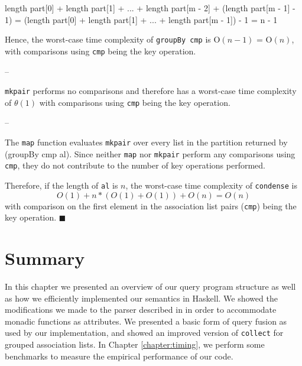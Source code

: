 \documentclass[../main.tex]{subfiles}
\begin{document}
\begin{code}
length part[0] + length part[1] + ... + length part[m - 2]
  + (length part[m - 1] - 1)
= (length part[0] + length part[1] + ... + length part[m - 1]) - 1
= n - 1
\end{code}

Hence, the worst-case time complexity of \texttt{groupBy cmp} is O$(n - 1)$ = O$(n)$, with comparisons using \texttt{cmp} being the key operation.
\qedsymbol

--

\texttt{mkpair} performs no comparisons and therefore has a worst-case time complexity of
$\theta(1)$ with comparisons using \texttt{cmp} being the key operation.

--

The \texttt{map} function evaluates \texttt{mkpair} over every list in the partition returned by (groupBy cmp al).  Since
neither \texttt{map} nor \texttt{mkpair} perform any comparisons using \texttt{cmp}, they do not contribute to the number
of key operations performed.

Therefore, if the length of \texttt{al} is $n$, the worst-case time complexity of \texttt{condense} is \[O(1) + n*(O(1) + O(1)) + O(n) = O(n)\] with comparison on the first element in the association list pairs (\texttt{cmp}) being the key operation.
$\blacksquare$



\section{Summary}

In this chapter we presented an overview of our query program structure as well as how we efficiently implemented our semantics in Haskell.
We showed the modifications we made to the parser described in \cite{frosthafiz2008} in order to accommodate monadic functions as attributes.
We presented a basic form of query fusion as used by our implementation, and showed an improved version of \texttt{collect} for
grouped association lists.  In Chapter \ref{chapter:timing}, we perform some benchmarks to measure the empirical performance of our code.
\end{document}
